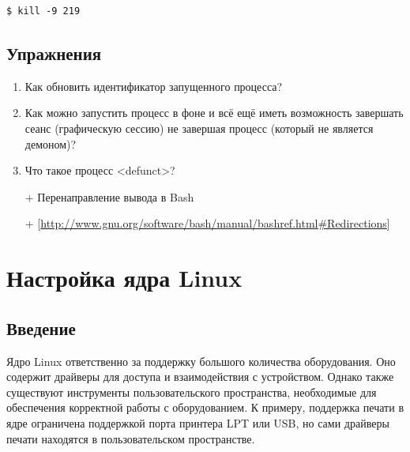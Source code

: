 \documentclass[10pt]{book}
\begin{document}
\vspace{3mm}
\begin{tcolorbox}
\begin{lstlisting}
$ kill -9 219
\end{lstlisting}
\end{tcolorbox}

\newpage

{\color{white}\section{Упражнения}}
\begin{tcolorbox}[title=\textbf{Упражнения}, colback=yellow!14!white, colframe=red!75!white]
\begin{enumerate}
\item Как обновить идентификатор запущенного процесса?
\item Как можно запустить процесс в фоне и всё ещё иметь возможность завершать сеанс (графическую сессию) не завершая процесс (который не является демоном)?
\item Что такое процесс <defunct>?
\end{enumerate}
\end{tcolorbox}

\begin{tcolorbox}[title=\textbf{Дальнейшие ресурсы}, colback=yellow!14!white, colframe=red!75!blue]
\begin{itemize}
\item[+] Перенаправление вывода в Bash 
\item[+] [\url{http://www.gnu.org/software/bash/manual/bashref.html\#Redirections}]
\end{itemize}
\end{tcolorbox}

\newpage

\chapter{Настройка ядра Linux}

\section*{Введение}

Ядро Linux ответственно за поддержку большого количества оборудования. Оно содержит драйверы для доступа и взаимодействия с устройством. Однако также существуют инструменты пользовательского пространства, необходимые для обеспечения корректной работы с оборудованием. К примеру, поддержка печати в ядре ограничена поддержкой порта принтера LPT или USB, но сами драйверы печати находятся в пользовательском пространстве.
\end{document}
